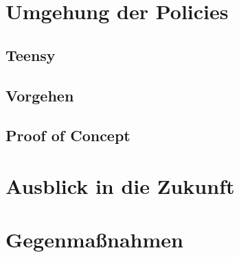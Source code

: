 \documentclass[a4paper,11pt,DIV=11,BROC=5mm,bigheadings,idxtotoc,cleardoubleempty,halfparskip,oneside,openright]{scrreprt} %
\begin{document}
			\chapter{Umgehung der Policies}\label{Angriff}
			\section{Teensy}
			\section{Vorgehen}
			\section{Proof of Concept} \label{PoC}

			\chapter{Ausblick in die Zukunft}			
			
			\chapter{Gegenmaßnahmen}
	
			
			
			
			
			\newpage
		
	
\end{document}
